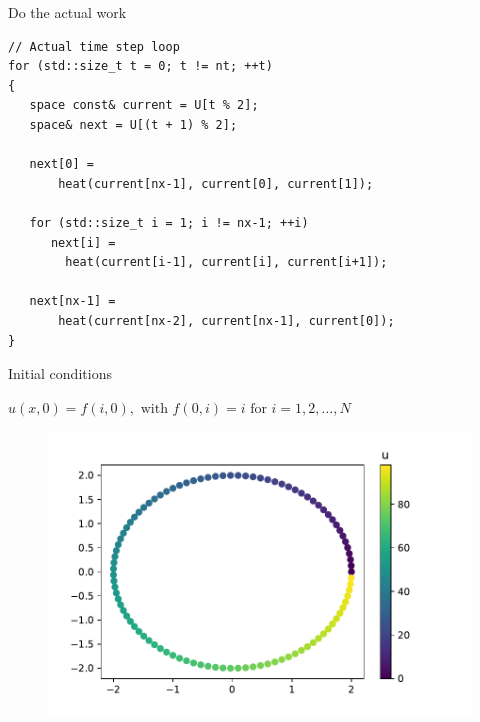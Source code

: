\documentclass[12pt,t]{beamer}
\begin{document}
\begin{frame}[fragile]{Do the actual work}

\begin{lstlisting}
// Actual time step loop
for (std::size_t t = 0; t != nt; ++t)
{
   space const& current = U[t % 2];
   space& next = U[(t + 1) % 2];

   next[0] = 
       heat(current[nx-1], current[0], current[1]);

   for (std::size_t i = 1; i != nx-1; ++i)
      next[i] = 
      	heat(current[i-1], current[i], current[i+1]);

   next[nx-1] = 
       heat(current[nx-2], current[nx-1], current[0]);
}
\end{lstlisting}


\end{frame}

\begin{frame}{Initial conditions}

\begin{center}
$u(x,0) = f(i,0), \text{ with } f(0,i)=i \text{ for } i=1,2,\ldots,N$
\end{center}

\begin{figure}
\includegraphics[scale=0.5]{./images/initial_conditons.pdf}
\end{figure}

\end{frame}
\end{document}

